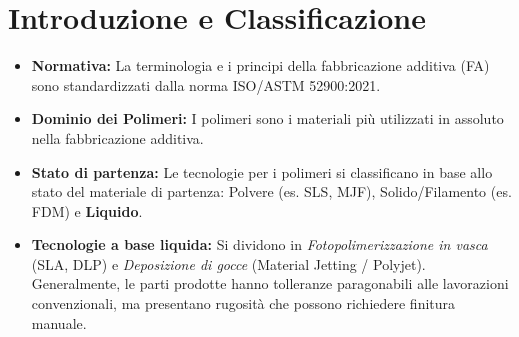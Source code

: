 %
%
\section{Introduzione e Classificazione}
\begin{itemize}
    \item \textbf{Normativa:} La terminologia e i principi della fabbricazione additiva (FA) sono standardizzati dalla norma ISO/ASTM 52900:2021.
    \item \textbf{Dominio dei Polimeri:} I polimeri sono i materiali più utilizzati in assoluto nella fabbricazione additiva.
    \item \textbf{Stato di partenza:} Le tecnologie per i polimeri si classificano in base allo stato del materiale di partenza: Polvere (es. SLS, MJF), Solido/Filamento (es. FDM) e \textbf{Liquido}.
    \item \textbf{Tecnologie a base liquida:} Si dividono in \textit{Fotopolimerizzazione in vasca} (SLA, DLP) e \textit{Deposizione di gocce} (Material Jetting / Polyjet). Generalmente, le parti prodotte hanno tolleranze paragonabili alle lavorazioni convenzionali, ma presentano rugosità che possono richiedere finitura manuale.
\end{itemize}


